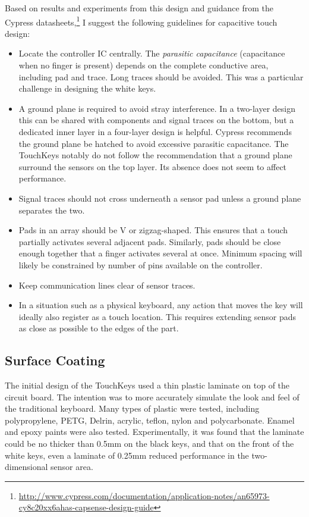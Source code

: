 Based on results and experiments from this design and guidance from the Cypress datasheets,\footnote{\url{http://www.cypress.com/documentation/application-notes/an65973-cy8c20xx6ahas-capsense-design-guide}} I suggest the following guidelines for capacitive touch design:

\begin{itemize}
\item{Locate the controller IC centrally. The {\it parasitic capacitance} (capacitance when no finger is present) depends on the complete conductive area, including pad and trace. Long traces should be avoided. This was a particular challenge in designing the white keys.}
\item{A ground plane is required to avoid stray interference. In a two-layer design this can be shared with components and signal traces on the bottom, but a dedicated inner layer in a four-layer design is helpful. Cypress recommends the ground plane be hatched to avoid excessive parasitic capacitance. The TouchKeys notably do not follow the recommendation that a ground plane surround the sensors on the top layer. Its absence does not seem to affect performance.}
\item{Signal traces should not cross underneath a sensor pad unless a ground plane separates the two.}
\item{Pads in an array should be V or zigzag-shaped. This ensures that a touch partially activates several adjacent pads. Similarly, pads should be close enough together that a finger activates several at once. Minimum spacing will likely be constrained by number of pins available on the controller.}
\item{Keep communication lines clear of sensor traces.}
\item{In a situation such as a physical keyboard, any action that moves the key will ideally also register as a touch location. This requires extending sensor pads as close as possible to the edges of the part.}
\end{itemize}

\subsection{Surface Coating}
The initial design of the TouchKeys \cite{McPherson:2011} used a thin plastic laminate on top of the circuit board. The intention was to more accurately simulate the look and feel of the traditional keyboard. Many types of plastic were tested, including polypropylene, PETG, Delrin, acrylic, teflon, nylon and polycarbonate. Enamel and epoxy paints were also tested. Experimentally, it was found that the laminate could be no thicker than 0.5mm on the black keys, and that on the front of the white keys, even a laminate of 0.25mm reduced performance in the two-dimensional sensor area.

